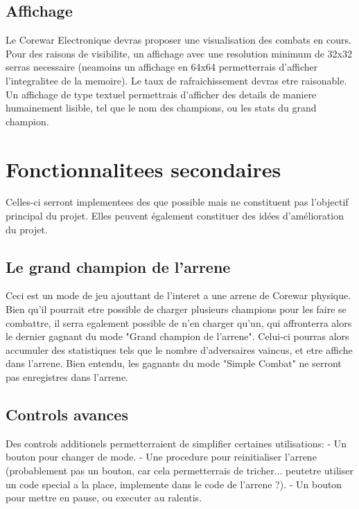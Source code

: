 \documentclass[12pt,a4paper,titlepage]{article}
\begin{document}
        \subsection{Affichage}

Le Corewar Electronique devras proposer une visualisation des combats en cours.  
Pour des raisons de visibilite, un affichage avec une resolution minimum de 32x32 serras necessaire (neamoins un affichage en 64x64 permetterrais d'afficher l'integralitee de la memoire). Le taux de rafraichissement devras etre raisonable.  
Un affichage de type textuel permettrais d'afficher des details de maniere humainement lisible, tel que le nom des champions, ou les stats du grand champion.  

      \section{Fonctionnalitees secondaires}

Celles-ci serront implementees des que possible mais ne constituent pas l'objectif principal du projet.  
Elles peuvent également constituer des idées d'amélioration du projet.

        \subsection{Le grand champion de l'arrene}

Ceci est un mode de jeu ajouttant de l'interet a une arrene de Corewar physique.  
Bien qu'il pourrait etre possible de charger plusieurs champions pour les faire se combattre, il serra egalement possible de n'en charger qu'un, qui affronterra alors le dernier gagnant du mode "Grand champion de l'arrene". Celui-ci pourras alors accumuler des statistiques tels que le nombre d'adversaires vaincus, et etre affiche dans l'arrene.  
Bien entendu, les gagnants du mode "Simple Combat" ne serront pas enregistres dans l'arrene.  

        \subsection{Controls avances}

Des controls additionels permetterraient de simplifier certaines utilisations:
- Un bouton pour changer de mode.
- Une procedure pour reinitialiser l'arrene (probablement pas un bouton, car cela permetterrais de tricher... peutetre utiliser un code special a la place, implemente dans le code de l'arrene ?).
- Un bouton pour mettre en pause, ou executer au ralentis.
\end{document}
